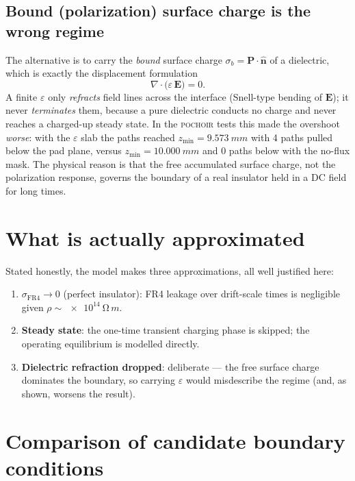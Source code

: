 \documentclass[11pt]{article}
\newcommand{\nhat}{\hat{\mathbf{n}}}
\begin{document}
\subsection{Bound (polarization) surface charge is the wrong regime}
The alternative is to carry the \emph{bound} surface charge
$\sigma_b = \mathbf{P}\cdot\nhat$ of a dielectric, which is exactly the displacement
formulation
\begin{equation}
  \nabla\!\cdot\!\big(\varepsilon\,\mathbf{E}\big) = 0 .
  \label{eq:displacement}
\end{equation}
A finite $\varepsilon$ only \emph{refracts} field lines across the interface
(Snell-type bending of $\mathbf{E}$); it never \emph{terminates} them, because a
pure dielectric conducts no charge and never reaches a charged-up steady state. In
the \textsc{pochoir} tests this made the overshoot \emph{worse}: with the
$\varepsilon$ slab the paths reached $z_{\min}=\SI{9.573}{mm}$ with 4 paths pulled
below the pad plane, versus $z_{\min}=\SI{10.000}{mm}$ and 0 paths below with the
no-flux mask. The physical reason is that the free accumulated surface charge, not
the polarization response, governs the boundary of a real insulator held in a DC
field for long times.

\section{What is actually approximated}

Stated honestly, the model makes three approximations, all well justified here:
\begin{enumerate}
  \item \textbf{$\sigma_{\mathrm{FR4}}\to 0$} (perfect insulator): FR4 leakage over
        drift-scale times is negligible given $\rho\sim\SI{e14}{\ohm\,m}$.
  \item \textbf{Steady state}: the one-time transient charging phase is skipped;
        the operating equilibrium is modelled directly.
  \item \textbf{Dielectric refraction dropped}: deliberate --- the free surface
        charge dominates the boundary, so carrying $\varepsilon$ would misdescribe
        the regime (and, as shown, worsens the result).
\end{enumerate}

\section{Comparison of candidate boundary conditions}
\end{document}
